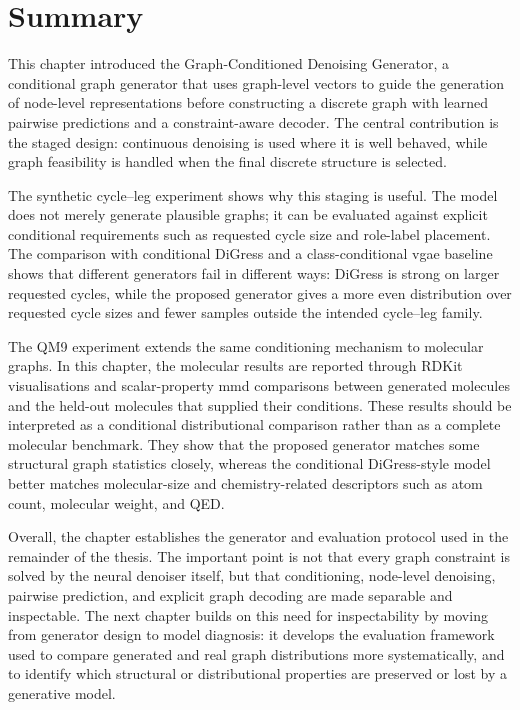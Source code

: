 \section{Summary}
\label{sec:generator:summary}

This chapter introduced the Graph-Conditioned Denoising Generator, a
conditional graph generator that uses graph-level vectors to guide the
generation of node-level representations before constructing a discrete graph
with learned pairwise predictions and a constraint-aware decoder. The central
contribution is the staged design: continuous denoising is used where it is
well behaved, while graph feasibility is handled when the final discrete
structure is selected.

The synthetic cycle--leg experiment shows why this staging is useful. The model
does not merely generate plausible graphs; it can be evaluated against explicit
conditional requirements such as requested cycle size and role-label placement.
The comparison with conditional DiGress and a class-conditional \gls{vgae}
baseline shows that different generators fail in different ways: DiGress is
strong on larger requested cycles, while the proposed generator gives a more
even distribution over requested cycle sizes and fewer samples outside the
intended cycle--leg family.

The QM9 experiment extends the same conditioning mechanism to molecular graphs.
In this chapter, the molecular results are reported through RDKit
visualisations and scalar-property \gls{mmd} comparisons between generated
molecules and the held-out molecules that supplied their conditions. These
results should be interpreted as a conditional distributional comparison rather
than as a complete molecular benchmark. They show that the proposed generator
matches some structural graph statistics closely, whereas the conditional
DiGress-style model better matches molecular-size and chemistry-related
descriptors such as atom count, molecular weight, and QED.

Overall, the chapter establishes the generator and evaluation protocol used in
the remainder of the thesis. The important point is not that every graph
constraint is solved by the neural denoiser itself, but that conditioning,
node-level denoising, pairwise prediction, and explicit graph decoding are made
separable and inspectable. The next chapter builds on this need for
inspectability by moving from generator design to model diagnosis: it develops
the evaluation framework used to compare generated and real graph distributions
more systematically, and to identify which structural or distributional
properties are preserved or lost by a generative model.
